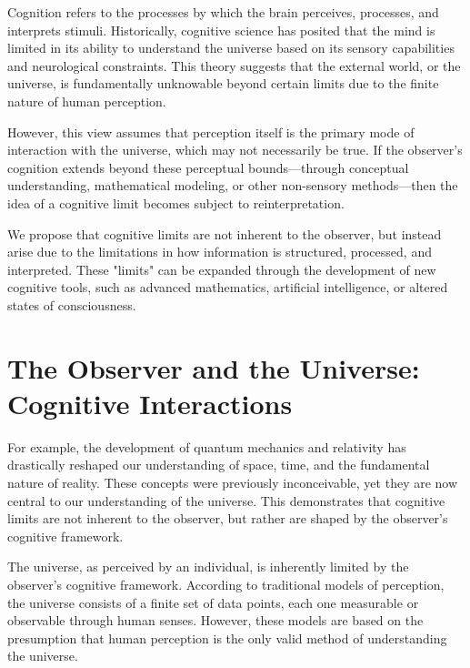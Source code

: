 \documentclass[twocolumn]{article}
\begin{document}
    Cognition refers to the processes by which the brain perceives, processes, and interprets stimuli.
    Historically, cognitive science has posited that the mind is limited in its ability to understand
    the universe based on its sensory capabilities and neurological constraints.
    This theory suggests that the external world, or the universe,
    is fundamentally unknowable beyond certain limits due to the finite nature of human perception.

    However, this view assumes that perception itself is the primary mode of interaction with the universe,
    which may not necessarily be true.
    If the observer's cognition extends beyond these perceptual
    bounds—through conceptual understanding, mathematical modeling, or other non-sensory methods—then
    the idea of a cognitive limit becomes subject to reinterpretation.

    We propose that cognitive limits are not inherent to the observer, but instead arise
    due to the limitations in how information is structured, processed, and interpreted.
    These "limits" can be expanded through the development of new cognitive tools, such as advanced mathematics,
    artificial intelligence, or altered states of consciousness.

    \lipsum[3-4]


    \section{The Observer and the Universe: Cognitive Interactions}
    \label{sec:the-observer-and-the-universe:-cognitive-interactions}

    For example, the development of quantum mechanics and relativity has drastically reshaped
    our understanding of space, time, and the fundamental nature of reality.
    These concepts were previously inconceivable, yet they are now central to our understanding of the universe.
    This demonstrates that cognitive limits are not inherent to the observer,
    but rather are shaped by the observer's cognitive framework.

    The universe, as perceived by an individual, is inherently limited by the observer's cognitive framework.
    According to traditional models of perception, the universe consists of a finite set of data points,
    each one measurable or observable through human senses.
    However, these models are based on the presumption that human perception
    is the only valid method of understanding the universe.
\end{document}
